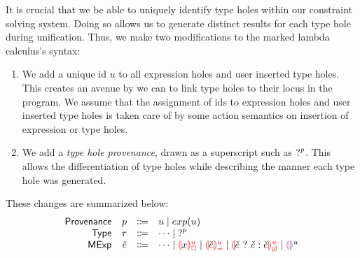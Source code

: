 \label{sec:typinf}
It is crucial that we be able to uniquely identify type holes within our constraint solving system. Doing so allows us to generate distinct results for each type hole during unification. Thus, we make two modifications to the marked lambda calculus's syntax:
\begin{enumerate}
    \item We add a unique id $u$ to all expression holes and user inserted type holes. This creates an avenue by we can to link type holes to their locus in the program. We assume that the assignment of ids to expression holes and user inserted type holes is taken care of by some action semantics on insertion of expression or type holes. 
    \item We add a \emph{type hole provenance}, drawn as a superscript such as $\mathtt{?}^p$. This allows the differentiation of type holes while describing the manner each type hole was generated.
\end{enumerate}
  
These changes are summarized below:
\[\begin{array}{rrcl}
    \Prov & \Provp & \Coloneqq & u \mid exp(u) \\
    \TMName  & \TMV  & \Coloneqq & \dots \mid \TUnknown^{p}\\
    \ECMName & \ECMV & \Coloneqq & \dots \mid \ECUnboundId{x}{u} \mid \ECInconTypeId{\ECMV}{u} \mid \ECInconBrId{\ECMV}{\ECMV}{\ECMV}{u} \mid \EEHole^u
\end{array}\]

